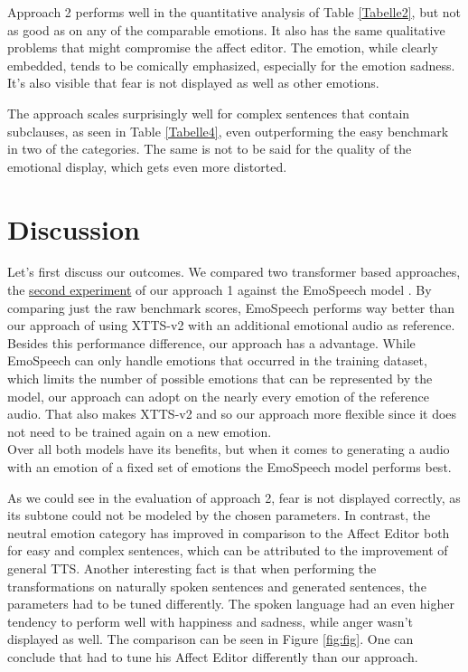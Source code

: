 \documentclass[11pt]{article}
\begin{document}
Approach 2 performs well in the quantitative analysis of Table \ref{Tabelle2}, but not as good as \cite{cahn_generation_2000} on any of the comparable emotions. It also has the same qualitative problems that might compromise the affect editor. The emotion, while clearly embedded, tends to be comically emphasized, especially for the emotion sadness. It's also visible that fear is not displayed as well as other emotions.

The approach scales surprisingly well for complex sentences that contain subclauses, as seen in Table \ref{Tabelle4}, even outperforming the easy benchmark in two of the categories. The same is not to be said for the quality of the emotional display, which gets even more distorted.


\section{Discussion}
\label{discussion}
Let's first discuss our outcomes.
We compared two transformer based approaches, the \hyperref[Experiment 2]{second experiment} of our approach 1 against the EmoSpeech model \cite{diatlova_emospeech_2023}. By comparing just the raw benchmark scores, EmoSpeech performs way better than our approach of using XTTS-v2 \cite{casanova2024xtts} with an additional emotional audio as reference. Besides this performance difference, our approach has a advantage. While EmoSpeech can only handle emotions that occurred in the training dataset, which limits the number of possible emotions that can be represented by the model, our approach can adopt on the nearly every emotion of the reference audio. That also makes XTTS-v2 and so our approach more flexible since it does not need to be trained again on a new emotion. \\
Over all both models have its benefits, but when it comes to generating a audio with an emotion of a fixed set of emotions the EmoSpeech model performs best.

As we could see in the evaluation of approach 2, fear is not displayed correctly, as its subtone could not be modeled by the chosen parameters. In contrast, the neutral emotion category has improved in comparison to the Affect Editor both for easy and complex sentences, which can be attributed to the improvement of general TTS. Another interesting fact is that when performing the transformations on naturally spoken sentences and generated sentences, the parameters had to be tuned differently. The spoken language had an even higher tendency to perform well with happiness and sadness, while anger wasn't displayed as well. The comparison can be seen in Figure \ref{fig:fig}. One can conclude that \cite{cahn_generation_2000} had to tune his Affect Editor differently than our approach.
\end{document}
